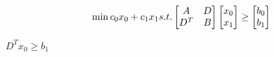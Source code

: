 \documentclass{article}
\begin{document}
\begin{equation}
\min c_0x_0+c_1x_1\\
s.t. \begin{bmatrix}
A & D \\ 
D^T & B
\end{bmatrix}\begin{bmatrix}
 x_0\\
x_1 
\end{bmatrix}\geq \begin{bmatrix}
b_0\\
b_1 
\end{bmatrix}
\end{equation}

$D^Tx_0\geq b_1$




\end{document}
